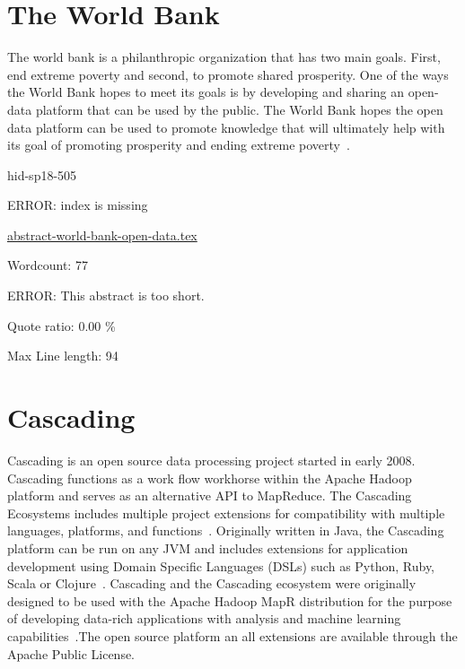 \section{The World Bank}

The world bank is a philanthropic organization that has two main goals.  First,
end extreme poverty and second, to promote shared prosperity.  One of the ways
the World Bank hopes to meet its goals is by developing and sharing an
open-data platform that can be used by the public.  The World Bank hopes the
open data platform can be used to promote knowledge that will ultimately help
with its goal of promoting prosperity and ending extreme poverty~\cite{hid-sp18-505-Bank2018}.


\begin{IU}

hid-sp18-505

ERROR: index is missing

\href{https://github.com/cloudmesh-community/hid-sp18-505/blob/master//technology/abstract-world-bank-open-data.tex}{abstract-world-bank-open-data.tex}

 

Wordcount: 77

ERROR: This abstract is too short.


Quote ratio: 0.00 \%
 
Max Line length: 94
\end{IU}

\section{Cascading}

Cascading is an open source data processing project started in early
2008. Cascading functions as a work flow workhorse within the Apache
Hadoop platform and serves as an alternative API to MapReduce. The
Cascading Ecosystems includes multiple project extensions for
compatibility with multiple languages, platforms, and
functions~\cite{hid-sp18-507-CascadingEco}. Originally written in
Java, the Cascading platform can be run on any JVM and includes
extensions for application development using Domain Specific Languages
(DSLs) such as Python, Ruby, Scala or
Clojure~\cite{hid-sp18-507-GitHubCascading}. Cascading and the
Cascading ecosystem were originally designed to be used with the
Apache Hadoop MapR distribution for the purpose of developing
data-rich applications with analysis and machine learning
capabilities~\cite{hid-sp18-507-MapR}.The open source platform an all
extensions are available through the Apache Public License.


